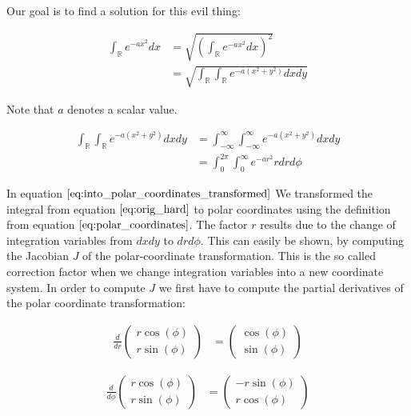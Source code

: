 \documentclass{paper}
\begin{document}
Our goal is to find a solution for this evil thing:

\begin{align}
    \int_{\mathbb{R}} e^{-ax^2} dx 
    &= \sqrt{\left(\int_{\mathbb{R}} e^{-ax^2} dx\right)^2} \\
    &= \sqrt{\int_{\mathbb{R}} \int_{\mathbb{R}} e^{-a(x^2 + y^2)} dx dy}
\label{eq:orig_hard}
\end{align}

Note that $a$ denotes a scalar value.

\begin{align}
    \int_{\mathbb{R}} \int_{\mathbb{R}} e^{-a(x^2 + y^2)} dx dy 
    & = \int_{-\infty}^{\infty} \int_{-\infty}^{\infty} e^{-a(x^2 + y^2)} dx dy \\
    &= \int_{0}^{2 \pi} \int_{0}^{\infty} e^{-ar^2} r dr d\phi
\label{eq:into_polar_coordinates_transformed}
\end{align}

In equation $\ref{eq:into_polar_coordinates_transformed}$ We transformed the integral from equation $\ref{eq:orig_hard}$ to polar coordinates using the definition from equation $\ref{eq:polar_coordinates}$. The factor $r$ results due to the change of integration variables from $dx dy$ to $dr d\phi$. This can easily be shown, by computing the Jacobian $J$ of the polar-coordinate transformation. This is the so called correction factor when we change integration variables into a new coordinate system. In order to compute $J$ we first have to compute the partial derivatives of the polar coordinate transformation:

\begin{align}
    \frac{d}{dr} \begin{pmatrix}r \cos(\phi)\\r \sin(\phi)\end{pmatrix} 
    &= \begin{pmatrix} \cos(\phi)\\ \sin(\phi)\end{pmatrix}
\end{align}

\begin{align}
    \frac{d}{d\phi} \begin{pmatrix}r \cos(\phi)\\r \sin(\phi)\end{pmatrix} 
    &= \begin{pmatrix}-r \sin(\phi)\\ r \cos(\phi)\end{pmatrix}
\end{align}
\end{document}

